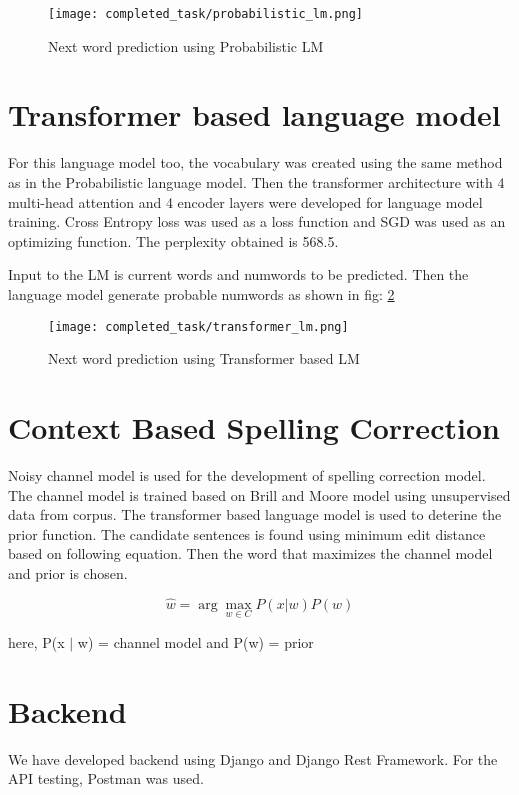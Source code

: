 \begin{figure}[H]
	\centering
	\texttt{[image: completed\_task/probabilistic\_lm.png]}
	\caption{Next word prediction using Probabilistic LM}
	\label{fig:Next word prediction using Probabilistic LM}
\end{figure}

\section{Transformer based language model}
For this language model too, the vocabulary was created using the same method as in the Probabilistic language model. Then the transformer architecture with 4 multi-head attention and 4 encoder layers were developed for language model training. Cross Entropy loss was used as a loss function and SGD was used as an optimizing function. The perplexity obtained is 568.5.

Input to the LM is current words and  num\textunderscore words to be predicted. Then the language model generate probable num\textunderscore words as shown in fig: \ref{fig:Next word prediction using Transformer based LM}

\begin{figure}[H]
	\centering
	\texttt{[image: completed\_task/transformer\_lm.png]}
	\caption{Next word prediction using Transformer based LM}
	\label{fig:Next word prediction using Transformer based LM}
\end{figure}

\section{Context Based Spelling Correction}
Noisy channel model is used for the development of spelling correction model. The channel model is trained based on Brill and Moore model using unsupervised data from corpus. The transformer based language model is used to deterine the prior function. The candidate sentences is found using minimum edit distance based on following equation. Then the word that maximizes the channel model and prior is chosen.

\begin{equation}
    \hat{w} = \arg \max_{w \in C} P(x | w) P (w)
\end{equation}

here, P(x $|$ w) = channel model and P(w) = prior

\section{Backend}
We have developed backend using Django and Django Rest Framework. For the API testing, Postman was used. 







